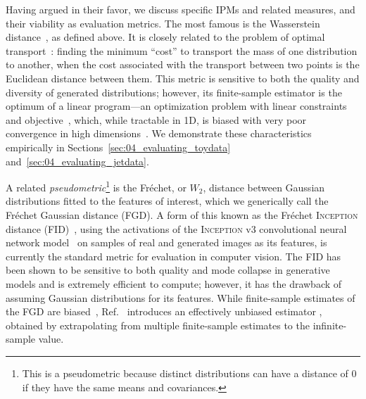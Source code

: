 Having argued in their favor, we discuss specific IPMs and related measures, and their viability as evaluation metrics. 
The most famous is the Wasserstein distance~\cite{wasserstein_original,villani_ot}, as defined above.
It is closely related to the problem of optimal transport~\cite{villani_ot}: finding the minimum ``cost'' to transport the mass of one distribution to another, when the cost associated with the transport between two points is the Euclidean distance between them.
This metric is sensitive to both the quality and diversity of generated distributions; however, its finite-sample estimator is the optimum of a linear program---an optimization problem with linear constraints and objective~\cite{vanderbei2013linear}, which, while tractable in 1D, is biased with very poor convergence in high dimensions~\cite{ramdas_wasserstein}.
We demonstrate these characteristics empirically in Sections~\ref{sec:04_evaluating_toydata} and~\ref{sec:04_evaluating_jetdata}.

A related \textit{pseudometric}\footnote{This is a pseudometric because distinct distributions can have a distance of 0 if they have the same means and covariances.} is the Fr\'echet, or $W_2$, distance between Gaussian distributions fitted to the features of interest, which we generically call the Fr\'echet Gaussian distance (FGD).
A form of this known as the Fr\'echet \textsc{Inception} distance (FID)~\cite{TTUR}, using the activations of the \textsc{Inception} v3 convolutional neural network model~\cite{inception_v3} on samples of real and generated images as its features, is currently the standard metric for evaluation in computer vision.
The FID has been shown to be sensitive to both quality and mode collapse in generative models and is extremely efficient to compute; however, it has the drawback of assuming Gaussian distributions for its features.
While finite-sample estimates of the FGD are biased~\cite{binkowski_demystifying}, Ref.~\cite{chong_unbiasedfid} introduces an effectively unbiased estimator \fgdinf, obtained by extrapolating from multiple finite-sample estimates to the infinite-sample value. 

